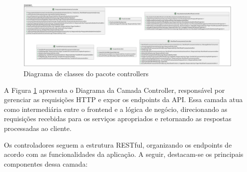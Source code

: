 \documentclass[
	12pt,				%
	oneside,			%
	a4paper,			%
	english,			%
	french,				%
	spanish,			%
	brazil				%
	]{abntex2}
\begin{document}
\begin{figure}[htbp]
\hypertarget{diagram_controller}{%
\caption{Diagrama de classes do pacote controllers}\label{diagram_controller}
\begin{center}
\includegraphics[scale=0.2]{imagens/sentilytics/diagramas/classes/controller-classes.png}
\end{center}
}
\end{figure}

A Figura \ref{diagram_controller} apresenta o Diagrama da Camada
Controller, responsável por gerenciar as requisições HTTP e expor os
endpoints da API. Essa camada atua como intermediária entre o frontend e
a lógica de negócio, direcionando as requisições recebidas para os
serviços apropriados e retornando as respostas processadas ao cliente.

Os controladores seguem a estrutura RESTful, organizando os endpoints de
acordo com as funcionalidades da aplicação. A seguir, destacam-se os
principais componentes dessa camada:
\end{document}
